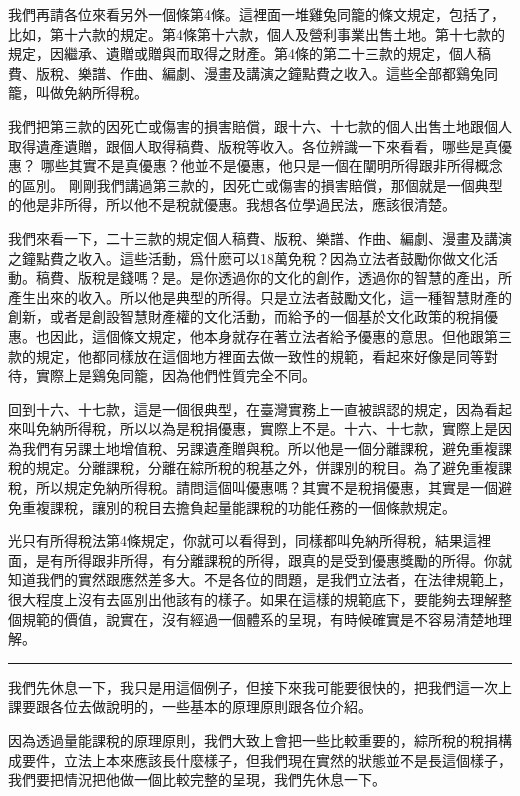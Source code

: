 \documentclass[oneside,sub3section]{ctexbook}
\begin{document}
我們再請各位來看另外一個條第4條。這裡面一堆雞兔同籠的條文規定，包括了，比如，第十六款的規定。第4條第十六款，個人及營利事業出售土地。第十七款的規定，因繼承、遺贈或贈與而取得之財產。第4條的第二十三款的規定，個人稿費、版稅、樂譜、作曲、編劇、漫畫及講演之鐘點費之收入。這些全部都鷄兔同籠，叫做免納所得稅。

我們把第三款的因死亡或傷害的損害賠償，跟十六、十七款的個人出售土地跟個人取得遺產遺贈，跟個人取得稿費、版稅等收入。各位辨識一下來看看，哪些是真優惠？ 哪些其實不是真優惠？他並不是優惠，他只是一個在闡明所得跟非所得概念的區別。
剛剛我們講過第三款的，因死亡或傷害的損害賠償，那個就是一個典型的他是非所得，所以他不是稅就優惠。我想各位學過民法，應該很清楚。

我們來看一下，二十三款的規定個人稿費、版稅、樂譜、作曲、編劇、漫畫及講演之鐘點費之收入。這些活動，爲什麽可以18萬免稅？因為立法者鼓勵你做文化活動。稿費、版稅是錢嗎？是。是你透過你的文化的創作，透過你的智慧的產出，所產生出來的收入。所以他是典型的所得。只是立法者鼓勵文化，這一種智慧財產的創新，或者是創設智慧財產權的文化活動，而給予的一個基於文化政策的稅捐優惠。也因此，這個條文規定，他本身就存在著立法者給予優惠的意思。但他跟第三款的規定，他都同樣放在這個地方裡面去做一致性的規範，看起來好像是同等對待，實際上是鷄兔同籠，因為他們性質完全不同。

回到十六、十七款，這是一個很典型，在臺灣實務上一直被誤認的規定，因為看起來叫免納所得稅，所以以為是稅捐優惠，實際上不是。十六、十七款，實際上是因為我們有另課土地增值稅、另課遺產贈與稅。所以他是一個分離課稅，避免重複課稅的規定。分離課稅，分離在綜所稅的稅基之外，併課別的稅目。為了避免重複課稅，所以規定免納所得稅。請問這個叫優惠嗎？其實不是稅捐優惠，其實是一個避免重複課稅，讓別的稅目去擔負起量能課稅的功能任務的一個條款規定。

光只有所得稅法第4條規定，你就可以看得到，同樣都叫免納所得稅，結果這裡面，是有所得跟非所得，有分離課稅的所得，跟真的是受到優惠獎勵的所得。你就知道我們的實然跟應然差多大。不是各位的問題，是我們立法者，在法律規範上，很大程度上沒有去區別出他該有的樣子。如果在這樣的規範底下，要能夠去理解整個規範的價值，說實在，沒有經過一個體系的呈現，有時候確實是不容易清楚地理解。

\begin{center}\rule{0.5\linewidth}{0.5pt}\end{center}

我們先休息一下，我只是用這個例子，但接下來我可能要很快的，把我們這一次上課要跟各位去做說明的，一些基本的原理原則跟各位介紹。

因為透過量能課稅的原理原則，我們大致上會把一些比較重要的，綜所稅的稅捐構成要件，立法上本來應該長什麼樣子，但我們現在實然的狀態並不是長這個樣子，我們要把情況把他做一個比較完整的呈現，我們先休息一下。
\end{document}
